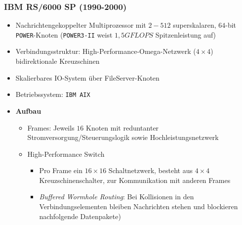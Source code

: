 \subsubsection{IBM RS/6000 SP (1990-2000)}
\begin{itemize}
	\item Nachrichtengekoppelter Multiprozessor mit \(2-512\) superskalaren, \(64\)-bit \texttt{POWER}-Knoten (\texttt{POWER3-II} weist \(1,5 GFLOPS\) Spitzenleistung auf)
	\item Verbindungsstruktur: High-Performance-Omega-Netzwerk (\(4 \times 4\)) bidirektionale Kreuzschinen
	\item Skalierbares IO-System über FileServer-Knoten
	\item Betriebssystem: \texttt{IBM AIX}
	\item \textbf{Aufbau}
	\begin{itemize}
		\item Frames: Jeweils \(16\) Knoten mit reduntanter Stromversorgung/Steuerungslogik sowie Hochleistungsnetzwerk
		\item High-Performance Switch
		\begin{itemize}
			\item Pro Frame ein \(16 \times 16\) Schaltnetzwerk, besteht aus \(4 \times 4\) Kreuzschinenschalter, zur Kommunikation mit anderen Frames
			\item \textit{Buffered Wormhole Routing}: Bei Kollisionen in den Verbindungselementen bleiben Nachrichten stehen und blockieren nachfolgende Datenpakete)
		\end{itemize}
	\end{itemize}
\end{itemize}

